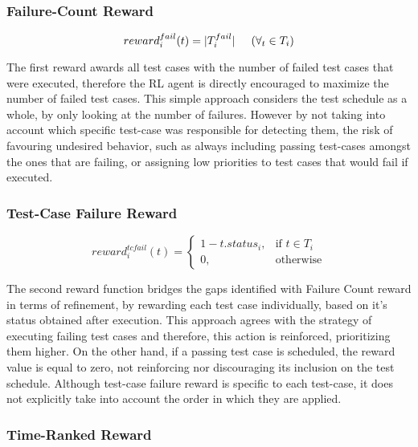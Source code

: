 \subsubsection{Failure-Count Reward}

\begin{equation}
	reward_{i}^{fail}(t) = \lvert T_i^{fail}\rvert \hspace{0.5cm} (\forall_t \in T_i)
\end{equation}

The first reward awards all test cases with the number of failed test cases that were executed, therefore the RL agent is directly encouraged to maximize the number of failed test cases. This simple approach considers the test schedule as a whole, by only looking at the number of failures. However by not taking into account which specific test-case was responsible for detecting them, the risk of favouring undesired behavior, such as always including passing test-cases amongst the ones that are failing, or assigning low priorities to test cases that would fail if executed. 

\subsubsection{Test-Case Failure Reward}

\begin{equation}
	reward_{i}^{tcfail}(t) = \begin{cases} 1 - t.status_i, & \mbox{if } t \in T_i \\ 0, & \mbox{otherwise} \end{cases}
\end{equation}

The second reward function bridges the gaps identified with Failure Count reward in terms of refinement, by rewarding each test case individually, based on it's status obtained after execution. This approach agrees with the strategy of executing failing test cases and therefore, this action is reinforced, prioritizing them higher. On the other hand, if a passing test case is scheduled, the reward value is equal to zero, not reinforcing nor discouraging its inclusion on the test schedule. Although test-case failure reward is specific to each test-case, it does not explicitly take into account the order in which they are applied. 


\subsubsection{Time-Ranked Reward}

